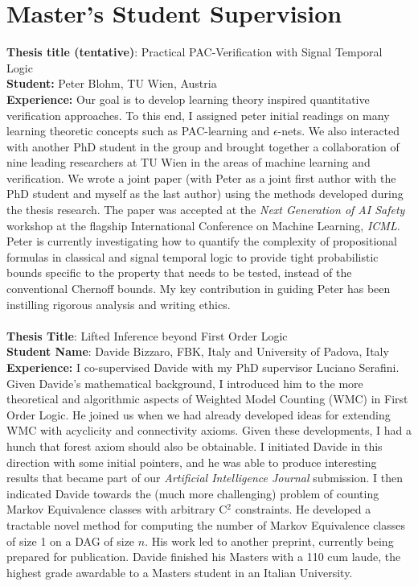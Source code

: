 \documentclass[10pt, a4paper]{article}
\newcommand{\years}[1]{\marginnote{\scriptsize #1}}
\begin{document}
 \section*{Master's Student Supervision}
 \textbf{Thesis title (tentative)}: Practical PAC-Verification with Signal Temporal Logic \\ 
 \years{2024-now} \textbf{Student:} Peter Blohm,  TU Wien, Austria\\
 \textbf{Experience:} Our goal is to develop learning theory inspired quantitative verification approaches. To this end, I assigned peter initial readings on many learning theoretic concepts such as PAC-learning and $\epsilon$-nets. We also interacted with another PhD student in the group and brought together a collaboration of nine leading researchers at TU Wien in the areas of machine learning and verification. We wrote a joint paper (with Peter as a joint first author with the PhD student and myself as the last author) using the methods developed during the thesis research.
 The paper was accepted at the \emph{Next Generation of AI Safety} workshop at the flagship International Conference on Machine Learning, \emph{ICML}. Peter is currently investigating how to quantify the complexity of propositional formulas in classical and signal temporal logic to provide tight probabilistic bounds specific to the property that needs to be tested, instead of the conventional Chernoff bounds. 
 My key contribution in guiding Peter has been instilling rigorous analysis and writing ethics.\\ \\


 \years{2023}\textbf{Thesis Title}:  Lifted Inference beyond First Order Logic\\
 \textbf{Student Name}: Davide Bizzaro, FBK, Italy and University of Padova, Italy\\
 \textbf{Experience:} I co-supervised Davide with my PhD supervisor Luciano Serafini. Given Davide's mathematical background, I introduced him to the more theoretical and algorithmic aspects of Weighted Model Counting (WMC) in First Order Logic. He joined us when we had already developed ideas for extending WMC with acyclicity and connectivity axioms.  Given these developments, I had a hunch that forest axiom should also be obtainable. I initiated Davide in this direction with some initial pointers, and he was able to produce interesting results that became part of our \emph{Artificial Intelligence Journal} submission. I then indicated Davide towards the (much more challenging) problem of counting Markov Equivalence classes with arbitrary C$^2$ constraints. He developed a tractable novel method for computing the number of Markov Equivalence classes of size 1 on a DAG of size $n$. His work led to another preprint, currently being prepared for publication.
Davide finished his Masters with a 110 cum laude, the highest grade awardable to a Masters student in an Italian University.
 
\end{document}
